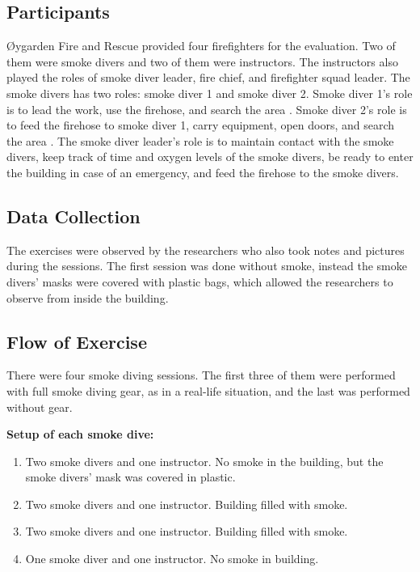\documentclass[../Main/thesis.tex]{subfiles}
\begin{document}
\subsection{Participants}
Øygarden Fire and Rescue provided four firefighters for the evaluation.
Two of them were smoke divers and two of them were instructors.
The instructors also played the roles of smoke diver leader, fire chief, and firefighter squad leader.
The smoke divers has two roles: smoke diver 1 and smoke diver 2.
Smoke diver 1's role is to lead the work, use the firehose, and search the area \citep{Direktoratetforsamfunnssikkerhetogberedskap1994}.
Smoke diver 2's role is to feed the firehose to smoke diver 1, carry equipment, open doors, and search the area \citep{Direktoratetforsamfunnssikkerhetogberedskap1994}.
The smoke diver leader's role is to maintain contact with the smoke divers, keep track of time and oxygen levels of the smoke divers, be ready to enter the building in case of an emergency, and feed the firehose to the smoke divers.

\subsection{Data Collection}
The exercises were observed by the researchers who also took notes and pictures during the sessions. 
The first session was done without smoke, instead the smoke divers' masks were covered with plastic bags, which allowed the researchers to observe from inside the building.

\subsection{Flow of Exercise}
There were four smoke diving sessions.
The first three of them were performed with full smoke diving gear, as in a real-life situation, and the last was performed without gear.

\textbf{Setup of each smoke dive:}
\begin{enumerate}
	\item Two smoke divers and one instructor. No smoke in the building, but the smoke divers' mask was covered in plastic.
	\item Two smoke divers and one instructor. Building filled with smoke.
	\item Two smoke divers and one instructor. Building filled with smoke.
	\item One smoke diver and one instructor. No smoke in building.
\end{enumerate}
\end{document}
